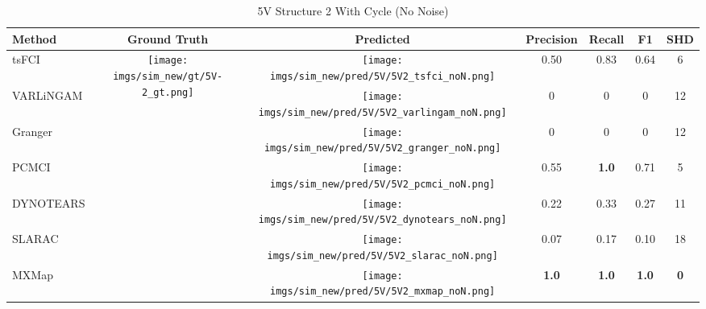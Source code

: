 \begin{table}[htb]
\begin{tabular}{l|c|c|c|c|c|c}
Method    & Ground Truth      & Predicted & Precision    & Recall       & F1           & SHD        \\ \hline
tsFCI     & \multirow{7}{*}[-8.6em]{\begin{minipage}{.17\linewidth} \centering \texttt{[image: imgs/sim\_new/gt/5V-2\_gt.png]} \end{minipage}} & \begin{minipage}{.17\linewidth} \centering \texttt{[image: imgs/sim\_new/pred/5V/5V2\_tsfci\_noN.png]} \end{minipage} & 0.50         & 0.83         & 0.64         & 6          \\
VARLiNGAM &                   & \begin{minipage}{.17\linewidth} \centering \texttt{[image: imgs/sim\_new/pred/5V/5V2\_varlingam\_noN.png]} \end{minipage} & 0            & 0            & 0            & 12         \\
Granger   &                   &  \begin{minipage}{.17\linewidth} \centering \texttt{[image: imgs/sim\_new/pred/5V/5V2\_granger\_noN.png]} \end{minipage}  & 0            & 0            & 0            & 12         \\
PCMCI     &                   &  \begin{minipage}{.17\linewidth} \centering \texttt{[image: imgs/sim\_new/pred/5V/5V2\_pcmci\_noN.png]} \end{minipage} & 0.55         & \textbf{1.0} & 0.71         & 5          \\
DYNOTEARS &                   &  \begin{minipage}{.17\linewidth} \centering \texttt{[image: imgs/sim\_new/pred/5V/5V2\_dynotears\_noN.png]} \end{minipage}  & 0.22         & 0.33         & 0.27         & 11         \\
SLARAC    &                   &  \begin{minipage}{.17\linewidth} \centering \texttt{[image: imgs/sim\_new/pred/5V/5V2\_slarac\_noN.png]} \end{minipage} & 0.07         & 0.17         & 0.10         & 18         \\ \cline{1-1} \cline{3-7} 
MXMap     &                   &  \begin{minipage}{.17\linewidth} \centering \texttt{[image: imgs/sim\_new/pred/5V/5V2\_mxmap\_noN.png]} \end{minipage}  & \textbf{1.0} & \textbf{1.0} & \textbf{1.0} & \textbf{0}
\end{tabular}
\caption{5V Structure 2 With Cycle (No Noise)}
\label{tab:5V2_noN}
\end{table}

